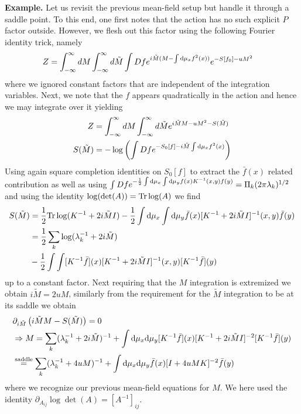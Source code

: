 {\bf Example.} Let us revisit the previous mean-field setup but handle it through a saddle point. To this end, one first notes that the action has no such explicit $P$ factor outside. However, we flesh out this factor using the following Fourier identity trick, namely 
\begin{align}
Z &= \int_{-\infty}^{\infty} dM \int_{-\infty}^{\infty} d\tilde{M}\int Df e^{i \tilde{M}(M-\int \text{d}\mu_x f^2(x))} e^{-S[f_0]-uM^2} 
\end{align}
where we ignored constant factors that are independent of the integration variables. Next, we note that the $f$ appears quadratically in the action and hence we may integrate over it yielding 
\begin{align}
Z &= \int_{-\infty}^{\infty} dM \int_{-\infty}^{\infty} d\tilde{M} e^{i \tilde{M} M-uM^2 - S(\tilde{M})} \\ \nonumber 
S(\tilde{M}) &= -\log \left( \int Df e^{-S_0[f]-i\tilde{M} \int \text{d}\mu_x f^2(x)}\right)
\end{align}
Using again square completion identities on $S_0[f]$ to extract the $\bar{f}(x)$ related contribution as well as using $\int Df e^{-\frac{1}{2} \int \text{d}\mu_x \int \text{d}\mu_y f(x) K^{-1}(x,y) f(y)}=\Pi_{k} (2\pi \lambda_k)^{1/2}$ and using the identity $\log(\text{det}(A))=\text{Tr} \log(A)$ we find 
\begin{align}
S(\tilde{M}) &= \frac{1}{2}\text{Tr}\log(K^{-1}+2i \tilde{M} I)-\frac{1}{2}
\int \text{d}\mu_x 
\int \text{d}\mu_y \bar{f}(x) [K^{-1}+2i\tilde{M}I]^{-1}(x,y) \bar{f}(y)  \\ \nonumber 
&= \frac{1}{2}\sum_k \log(\lambda_k^{-1}+2i\tilde{M}) \\ \nonumber 
&-\frac{1}{2}\int \int[K^{-1}\bar{f}](x) [K^{-1}+2i\tilde{M}I]^{-1}(x,y) [K^{-1}\bar{f}](y)
\end{align}
up to a constant factor. Next requiring that the $M$ integration is extremized we obtain $i \tilde{M}=2uM$, similarly from the requirement for the $\tilde{M}$ integration to be at its saddle we obtain
\begin{align}
&\partial_{i\tilde{M}
}\left(i \tilde{M}M - S(\tilde{M}) \right) = 0 \\ \nonumber 
&\Rightarrow  M =  \sum_k (\lambda_k^{-1}+2i \tilde{M})^{-1}+\int \text{d}\mu_x \text{d}\mu_y [K^{-1}\bar{f}](x)[K^{-1}+2i\tilde{M}I]^{-2} [K^{-1}\bar{f}](y) \\ \nonumber 
&\stackrel{\text{saddle}}{=} \sum_k (\lambda_k^{-1}+4uM)^{-1}+\int \text{d}\mu_x \text{d}\mu_y \bar{f}(x)[I+4uM K]^{-2} \bar{f}(y)\end{align}
where we recognize our previous mean-field equations for $M$. We here used the identity $\partial_ {A_{ij}} \log \det(A) = [A^{-1}]_{ij}$.

